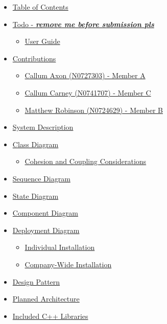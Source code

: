 \documentclass[
  english,
  a4paper,
,tablecaptionabove
]{scrartcl}
\providecommand{\tightlist}{%
  \setlength{\itemsep}{0pt}\setlength{\parskip}{0pt}}
\begin{document}
\begin{itemize}
\tightlist
\item
  \protect\hyperlink{table-of-contents}{Table of Contents}
\item
  \protect\hyperlink{todo---remove-me-before-submission-pls}{Todo -
  \textbf{\emph{remove me before submission pls}}}

  \begin{itemize}
  \tightlist
  \item
    \protect\hyperlink{user-guide}{User Guide}
  \end{itemize}
\item
  \protect\hyperlink{contributions}{Contributions}

  \begin{itemize}
  \tightlist
  \item
    \protect\hyperlink{callum-axon-n0727303---member-a}{Callum Axon
    (N0727303) - Member A}
  \item
    \protect\hyperlink{callum-carney-n0741707---member-c}{Callum Carney
    (N0741707) - Member C}
  \item
    \protect\hyperlink{matthew-robinson-n0724629---member-b}{Matthew
    Robinson (N0724629) - Member B}
  \end{itemize}
\item
  \protect\hyperlink{system-description}{System Description}
\item
  \protect\hyperlink{class-diagram}{Class Diagram}

  \begin{itemize}
  \tightlist
  \item
    \protect\hyperlink{cohesion-and-coupling-considerations}{Cohesion
    and Coupling Considerations}
  \end{itemize}
\item
  \protect\hyperlink{sequence-diagram}{Sequence Diagram}
\item
  \protect\hyperlink{state-diagram}{State Diagram}
\item
  \protect\hyperlink{component-diagram}{Component Diagram}
\item
  \protect\hyperlink{deployment-diagram}{Deployment Diagram}

  \begin{itemize}
  \tightlist
  \item
    \protect\hyperlink{individual-installation}{Individual Installation}
  \item
    \protect\hyperlink{company-wide-installation}{Company-Wide
    Installation}
  \end{itemize}
\item
  \protect\hyperlink{design-pattern}{Design Pattern}
\item
  \protect\hyperlink{planned-architecture}{Planned Architecture}
\item
  \protect\hyperlink{included-c-libraries}{Included C++ Libraries}


\end{itemize}
\end{document}
